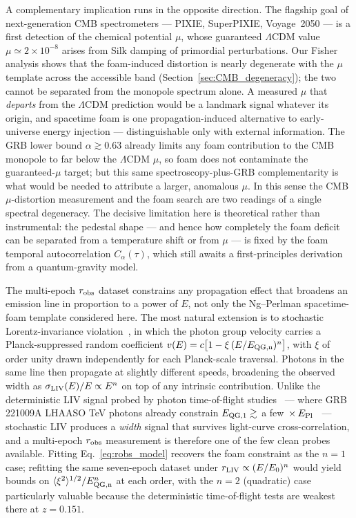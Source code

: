 \documentclass[aps,prd,onecolumn,amsmath,amssymb]{revtex4-2}
\begin{document}
A complementary implication runs in the opposite direction.  The
flagship goal of next-generation CMB spectrometers --- PIXIE,
SuperPIXIE, Voyage~2050 --- is a first detection of the chemical
potential $\mu$, whose guaranteed $\Lambda$CDM value
$\mu\simeq2\times10^{-8}$ arises from Silk damping of primordial
perturbations.  Our Fisher analysis shows that the foam-induced
distortion is nearly degenerate with the $\mu$ template across the
accessible band (Section~\ref{sec:CMB_degeneracy}); the two cannot be
separated from the monopole spectrum alone.  A measured $\mu$ that
\emph{departs} from the $\Lambda$CDM prediction would be a landmark
signal whatever its origin, and spacetime foam is one
propagation-induced alternative to early-universe energy injection ---
distinguishable only with external information.  The GRB lower bound
$\alpha\gtrsim0.63$ already limits any foam contribution to the CMB
monopole to far below the $\Lambda$CDM $\mu$, so foam does not
contaminate the guaranteed-$\mu$ target; but this same
spectroscopy-plus-GRB complementarity is what would be needed to
attribute a larger, anomalous $\mu$.  In this sense the CMB
$\mu$-distortion measurement and the foam search are two readings of a
single spectral degeneracy.  The decisive limitation here is
theoretical rather than instrumental: the pedestal shape --- and hence
how completely the foam deficit can be separated from a temperature
shift or from $\mu$ --- is fixed by the foam temporal autocorrelation
$C_\alpha(\tau)$, which still awaits a first-principles derivation from
a quantum-gravity model.

The multi-epoch $r_{\rm obs}$ dataset constrains any propagation
effect that broadens an emission line in proportion to a power of
$E$, not only the Ng--Perlman spacetime-foam template considered
here.  The most natural extension is to stochastic Lorentz-invariance
violation~\cite{AmelinoCamelia2013}, in which the photon group
velocity carries a Planck-suppressed random coefficient
$v(E)=c\bigl[1-\xi\,(E/E_{\rm QG,n})^n\bigr]$, with $\xi$ of order
unity drawn independently for each Planck-scale traversal.  Photons
in the same line then propagate at slightly different speeds,
broadening the observed width as
$\sigma_{\rm LIV}(E)/E\propto E^n$ on top of any intrinsic
contribution.  Unlike the deterministic LIV signal probed by photon
time-of-flight studies~\cite{Fermi2009} --- where GRB\,221009A LHAASO TeV photons
already constrain $E_{\rm QG,1}\gtrsim$ a
few~$\times\,E_{\rm Pl}$~\cite{LHAASO2024} --- stochastic LIV
produces a \emph{width} signal that survives light-curve
cross-correlation, and a multi-epoch $r_{\rm obs}$ measurement is
therefore one of the few clean probes available.  Fitting
Eq.~\eqref{eq:robs_model} recovers the foam constraint as the
$n=1$ case; refitting the same seven-epoch dataset under
$r_{\rm LIV}\propto(E/E_0)^n$ would yield bounds on
$\langle\xi^2\rangle^{1/2}/E_{\rm QG,n}^n$ at each order, with the
$n=2$ (quadratic) case particularly valuable because the
deterministic time-of-flight tests are weakest there at $z=0.151$.
\end{document}
